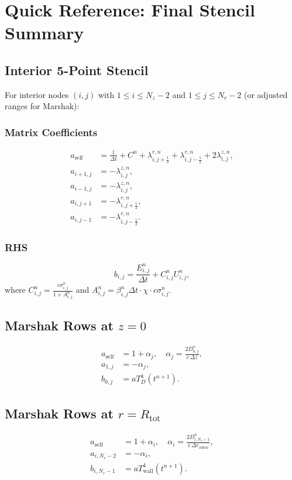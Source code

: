 \documentclass[12pt,oneside]{article}
\begin{document}
\appendix

\section{Quick Reference: Final Stencil Summary}

\subsection{Interior 5-Point Stencil}

For interior nodes $(i,j)$ with $1 \le i \le N_z-2$ and $1 \le j \le N_r-2$ (or adjusted ranges for Marshak):

\subsubsection{Matrix Coefficients}

\begin{align}
a_{\text{self}} &= \frac{1}{\Delta t} + C^n + \lambda^{r,n}_{i,j+\frac12} + \lambda^{r,n}_{i,j-\frac12} + 2\lambda^{z,n}_{i,j},\\
a_{i+1,j} &= -\lambda^{z,n}_{i,j},\\
a_{i-1,j} &= -\lambda^{z,n}_{i,j},\\
a_{i,j+1} &= -\lambda^{r,n}_{i,j+\frac12},\\
a_{i,j-1} &= -\lambda^{r,n}_{i,j-\frac12}.
\end{align}

\subsubsection{RHS}

\begin{equation}
b_{i,j} = \frac{E^n_{i,j}}{\Delta t} + C^n_{i,j} U^n_{i,j},
\end{equation}
where $C^n_{i,j} = \frac{c\sigma^n_{i,j}}{1 + A^n_{i,j}}$ and $A^n_{i,j} = \beta^n_{i,j} \Delta t \cdot \chi \cdot c\sigma^n_{i,j}$.

\subsection{Marshak Rows at $z=0$}

\begin{align}
a_{\text{self}} &= 1 + \alpha_j, \quad \alpha_j = \frac{2D^n_{0,j}}{c\,\Delta z},\\
a_{1,j} &= -\alpha_j,\\
b_{0,j} &= a T_D^4(t^{n+1}).
\end{align}

\subsection{Marshak Rows at $r=R_{\mathrm{tot}}$}

\begin{align}
a_{\text{self}} &= 1 + \alpha_i, \quad \alpha_i = \frac{2D^n_{i,N_r-1}}{c\,\Delta r_{\mathrm{outer}}},\\
a_{i,N_r-2} &= -\alpha_i,\\
b_{i,N_r-1} &= a T_{\mathrm{wall}}^4(t^{n+1}).
\end{align}
\end{document}

